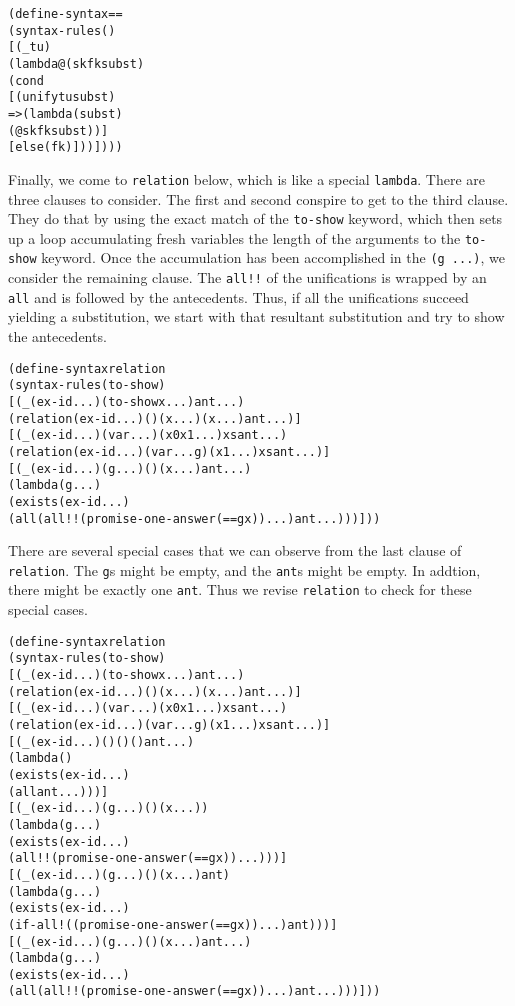 \begin{alltt}
(define-syntax ==
  (syntax-rules ()
    [(_ t u)
     (lambda@ (sk fk subst)
       (cond
         [(unify t u subst)
          => (lambda (subst)
               (@ sk fk subst))]
         [else (fk)]))])))
\end{alltt}

Finally, we come to \texttt{relation} below, which is like a special
\texttt{lambda}.  There are three clauses to consider.  The first and
second conspire to get to the third clause.  They do that by using the
exact match of the \texttt{to-show} keyword, which then sets up a loop
accumulating fresh variables the length of the arguments to the
\texttt{to-show} keyword.  Once the accumulation has been accomplished
in the \texttt{(g ...)}, we consider the remaining clause.  The
\texttt{all!!} of the unifications is wrapped by an \texttt{all} and
is followed by the antecedents.  Thus, if all the unifications succeed
yielding a substitution, we start with that resultant substitution and
try to show the antecedents.

\begin{alltt}
(define-syntax relation
  (syntax-rules (to-show)
    [(_ (ex-id ...) (to-show x ...) ant ...)
     (relation (ex-id ...) () (x ...) (x ...) ant ...)]
    [(_ (ex-id ...) (var ...) (x0 x1 ...) xs ant ...)
     (relation (ex-id ...) (var ... g) (x1 ...) xs ant ...)]
    [(_ (ex-id ...) (g ...) () (x ...) ant ...)
     (lambda (g ...)
       (exists (ex-id ...)
         (all (all!! (promise-one-answer (== g x)) ...) ant ...)))]))
\end{alltt}

There are several special cases that we can observe from the last
clause of \texttt{relation}.  The \texttt{g}s might be empty, and the
\texttt{ant}s might be empty.  In addtion, there might be exactly one
\texttt{ant}.  Thus we revise \texttt{relation} to check for these
special cases.

\begin{alltt}
(define-syntax relation
  (syntax-rules (to-show)
    [(_ (ex-id ...) (to-show x ...) ant ...)
     (relation (ex-id ...) () (x ...) (x ...) ant ...)]
    [(_ (ex-id ...) (var ...) (x0 x1 ...) xs ant ...)
     (relation (ex-id ...) (var ... g) (x1 ...) xs ant ...)]
    [(_ (ex-id ...) () () () ant ...)
     (lambda ()
       (exists (ex-id ...)
         (all ant ...)))]
    [(_ (ex-id ...) (g ...) () (x ...))
     (lambda (g ...)
       (exists (ex-id ...)
 	 (all!! (promise-one-answer (== g x)) ...)))]
    [(_ (ex-id ...) (g ...) () (x ...) ant)
     (lambda (g ...)
       (exists (ex-id ...)
 	 (if-all! ((promise-one-answer (== g x)) ...) ant)))]
    [(_ (ex-id ...) (g ...) () (x ...) ant ...)
     (lambda (g ...)
       (exists (ex-id ...)
         (all (all!! (promise-one-answer (== g x)) ...) ant ...)))]))
\end{alltt}

